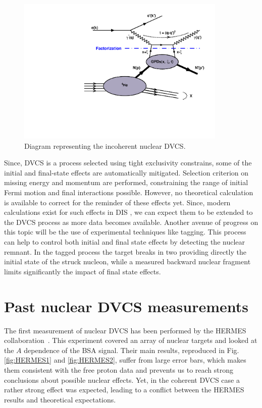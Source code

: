 \documentclass[aps,prc,preprint,superscriptaddress]{revtex4}
\begin{document}
\begin{figure}[tbp!]
\center
\includegraphics[width=10cm]{fig3/handbag_incoherent.pdf}
\caption{Diagram representing the incoherent nuclear DVCS.}
\label{fig:InCohDiag}
\end{figure}

Since, DVCS is a 
process selected using tight exclusivity constrains, some of the initial and final-state effects are
automatically mitigated. Selection criterion on missing energy and momentum are performed,
constraining the range of initial Fermi motion and final interactions possible. However, no theoretical
calculation is available to correct for the reminder of these effects yet. Since, modern calculations exist 
for such effects in DIS \cite{Cosyn:2017ekf}, we can expect them to be extended to the DVCS 
process as more data becomes available. Another avenue of progress
on this topic will be the use of experimental techniques like tagging. This process
can help to control both initial and final state effects by detecting the nuclear remnant.
In the tagged process the target breaks in two providing directly the initial state
of the struck nucleon, while a measured backward nuclear fragment limits significantly the
impact of final state effects.

\section{Past nuclear DVCS measurements}

The first measurement of nuclear DVCS has been performed by the HERMES 
collaboration~\cite{Airapetian:2009cga}. This experiment covered an array of 
nuclear targets and looked at the $A$ dependence of the
BSA signal. Their main results, reproduced in Fig. \ref{fig:HERMES1} and \ref{fig:HERMES2}, suffer
from large error bars, which makes them consistent with the free proton data and prevents us to
reach strong conclusions about possible nuclear effects. Yet, in the coherent DVCS case a rather
strong effect was expected, leading to a conflict between the HERMES results and theoretical
expectations. 
\end{document}
